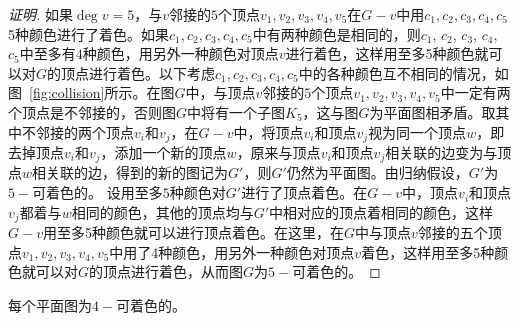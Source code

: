\begin{proof}[证明]
如果$\deg v = 5$，与$v$邻接的$5$个顶点$v_1,v_2,v_3,v_4,v_5$在$G-v$中用$c_1,c_2,c_3,c_4,c_5$ 5种颜色进行了着色。如果$c_1,c_2,c_3,c_4,c_5$中有两种颜色是相同的，则$c_1$, $c_2$, $c_3$, $c_4$, $c_5$中至多有$4$种颜色，用另外一种颜色对顶点$v$进行着色，这样用至多5种颜色就可以对$G$的顶点进行着色。以下考虑$c_1,c_2,c_3,c_4,c_5$中的各种颜色互不相同的情况，如图~\ref{fig:collision}所示。在图$G$中，与顶点$v$邻接的$5$个顶点$v_1,v_2,v_3,v_4,v_5$中一定有两个顶点是不邻接的，否则图$G$中将有一个子图$K_5$，这与图$G$为平面图相矛盾。取其中不邻接的两个顶点$v_i$和$v_j$，在$G-v$中，将顶点$v_i$和顶点$v_j$视为同一个顶点$w$，即去掉顶点$v_i$和$v_j$，添加一个新的顶点$w$，原来与顶点$v_i$和顶点$v_j$相关联的边变为与顶点$w$相关联的边，得到的新的图记为$G'$，则$G'$仍然为平面图。由归纳假设，$G'$为$5-$可着色的。 设用至多$5$种颜色对$G'$进行了顶点着色。在$G-v$中，顶点$v_i$和顶点$v_j$都着与$w$相同的颜色，其他的顶点均与$G'$中相对应的顶点着相同的颜色，这样$G-v$用至多5种颜色就可以进行顶点着色。在这里，在$G$中与顶点$v$邻接的五个顶点$v_1,v_2,v_3,v_4,v_5$中用了4种颜色，用另外一种颜色对顶点$v$着色，这样用至多5种颜色就可以对$G$的顶点进行着色，从而图$G$为$5-$可着色的。
\end{proof}

  \begin{Thm}
    每个平面图为$4-$可着色的。
  \end{Thm}

\chapter{}
